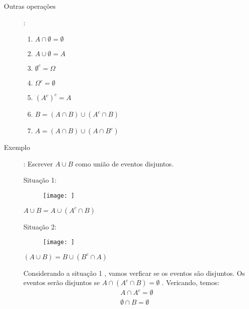 \documentclass[11pt,a4paper]{book}
\begin{document}
\begin{description}
\begin{description}
  \item [Outras operações]: 

    \begin{enumerate}[leftmargin=*, label=\Roman*., widest=IV, align=left]
      \item     $A \cap \emptyset= \emptyset$ 
      \item     $A \cup \emptyset = A$ 
      \item     $\emptyset^{c} = \Omega$ 
      \item     $ \Omega^c = \emptyset$ 
      \item     $(A^c)^c = A$ 
      \item     $B= (A \cap B)\cup (A^c \cap B)$
      \item     $A= (A \cap B) \cup (A \cap B^c)$
    \end{enumerate}
      \item [Exemplo]: Escrever $A \cup B$ como união de eventos disjuntos.

        \begin{figure}[H]
          \centering
          
          \caption{}
          \label{fig:11}
        \end{figure}

        Situação 1:
        \begin{figure}[H]
          \centering
          
          \texttt{[image: ]}
          \caption{}
          \label{fig:12}
        \end{figure}

        $A \cup B = A \cup (A^c \cap B)$

        Situação 2: 

        \begin{figure}[H]
          \centering
          
          \texttt{[image: ]}
          \caption{}
          \label{fig:13}
        \end{figure}

        $(A \cup B) = B \cup (B^c \cap A)$

        Considerando a situação 1 , vamos verficar se os eventos são disjuntos. Os eventos serão disjuntos se $A \cap ( A^c \cap B )= \emptyset$ . Vericando, temos: 
        \begin{align*}
          A \cap A^c = \emptyset \\
          \emptyset \cap B= \emptyset
        \end{align*}


\end{description}
\end{description}
\end{document}
